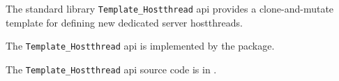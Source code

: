 
The standard library {\tt Template\_Hostthread} api provides a clone-and-mutate template 
for defining new dedicated server hostthreads.

The {\tt Template\_Hostthread} api is implemented by the  package.

The {\tt Template\_Hostthread} api source code is in .

